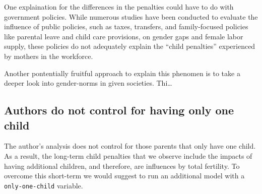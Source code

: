 \documentclass[
]{article}
\begin{document}
One explaination for the differences in the penalties could have to do
with government policies. While numerous studies have been conducted to
evaluate the influence of public policies, such as taxes, transfers, and
family-focused policies like parental leave and child care provisions,
on gender gaps and female labor supply, these policies do not adequately
explain the ``child penalties'' experienced by mothers in the workforce.

Another pontentially fruitful approach to explain this phenomen is to
take a deeper look into gender-norms in given societies. Thi\ldots{}

\hypertarget{authors-do-not-control-for-having-only-one-child}{%
\subsection{Authors do not control for having only one
child}\label{authors-do-not-control-for-having-only-one-child}}

The author's analysis does not control for those parents that only have
one child. As a result, the long-term child penalties that we observe
include the impacts of having additional children, and therefore, are
influences by total fertility. To overcome this short-term we would
suggest to run an additional model with a \texttt{only-one-child}
variable.
\end{document}
